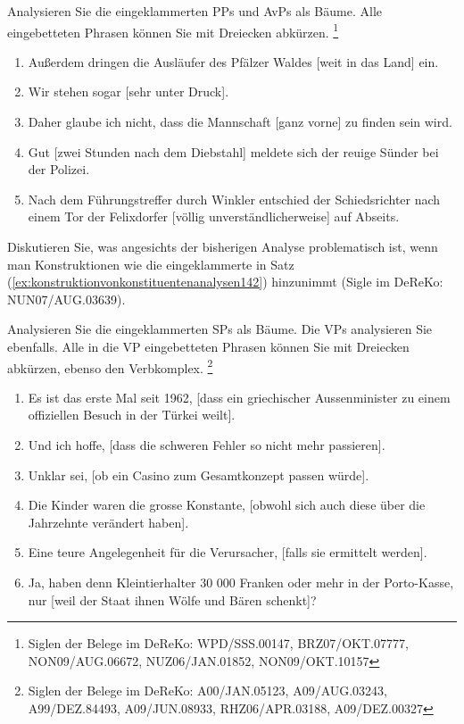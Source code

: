 \begin{sloppypar}
 \label{exc:phrasen02} Analysieren Sie die eingeklammerten PPs und AvPs als Bäume.
Alle eingebetteten Phrasen können Sie mit Dreiecken abkürzen.%
\footnote{Siglen der Belege im DeReKo: WPD\slash SSS.00147, BRZ07\slash OKT.07777, NON09\slash AUG.06672, NUZ06\slash JAN.01852, NON09\slash OKT.10157}

\begin{enumerate}
  \item Außerdem dringen die Ausläufer des Pfälzer Waldes [weit in das Land] ein.
  \item Wir stehen sogar [sehr unter Druck].
  \item Daher glaube ich nicht, dass die Mannschaft [ganz vorne] zu finden sein wird.
  \item Gut [zwei Stunden nach dem Diebstahl] meldete sich der reuige Sünder bei der Polizei.
  \item Nach dem Führungstreffer durch Winkler entschied der Schiedsrichter nach einem Tor der Felixdorfer [völlig unverständlicherweise] auf Abseits.
\end{enumerate}

 \label{exc:phrasen03} Diskutieren Sie, was angesichts der bisherigen Analyse problematisch ist, wenn man Konstruktionen wie die eingeklammerte in Satz (\ref{ex:konstruktionvonkonstituentenanalysen142}) hinzunimmt (Sigle im DeReKo: NUN07\slash AUG.03639).

\begin{exe}
\end{exe}

 \label{exc:phrasen04} Analysieren Sie die eingeklammerten SPs als Bäume.
Die VPs analysieren Sie ebenfalls.
Alle in die VP eingebetteten Phrasen können Sie mit Dreiecken abkürzen, ebenso den Verbkomplex.%
\footnote{Siglen der Belege im DeReKo: A00\slash JAN.05123, A09\slash AUG.03243, A99\slash DEZ.84493, A09\slash JUN.08933, RHZ06\slash APR.03188, A09\slash DEZ.00327}

\begin{enumerate}
  \item Es ist das erste Mal seit 1962, [dass ein griechischer Aussenminister zu einem offiziellen Besuch in der Türkei weilt].
  \item Und ich hoffe, [dass die schweren Fehler so nicht mehr passieren].
  \item Unklar sei, [ob ein Casino zum Gesamtkonzept passen würde].
  \item Die Kinder waren die grosse Konstante, [obwohl sich auch diese über die Jahrzehnte verändert haben].
  \item Eine teure Angelegenheit für die Verursacher, [falls sie ermittelt werden].
  \item Ja, haben denn Kleintierhalter 30 000 Franken oder mehr in der Porto-Kasse, nur [weil der Staat ihnen Wölfe und Bären schenkt]?
\end{enumerate}


\end{sloppypar}
